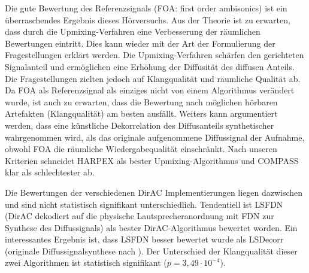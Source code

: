 Die gute Bewertung des Referenzsignals (FOA: first order ambisonics) ist ein überraschendes Ergebnis dieses Hörversuchs. Aus der Theorie ist zu erwarten, dass durch die Upmixing-Verfahren eine Verbesserung der räumlichen Bewertungen eintritt.
Dies kann wieder mit der Art der Formulierung der Fragestellungen erklärt werden.
Die Upmixing-Verfahren schärfen den gerichteten Signalanteil und ermöglichen eine Erhöhung der Diffusität des diffusen Anteils.
Die Fragestellungen zielten jedoch auf Klangqualität und räumliche Qualität ab.
Da FOA als Referenzsignal als einziges nicht von einem Algorithmus verändert wurde, ist auch zu erwarten, dass die Bewertung nach möglichen hörbaren Artefakten (Klangqualität) am besten ausfällt.
Weiters kann argumentiert werden, dass eine künstliche Dekorrelation des Diffusanteils synthetischer wahrgenommen wird, als das originale aufgenommene Diffussignal der Aufnahme, obwohl FOA die räumliche Wiedergabequalität einschränkt.
Nach unseren Kriterien schneidet HARPEX als bester Upmixing-Algorithmus und COMPASS klar als schlechtester ab.

Die Bewertungen der verschiedenen DirAC Implementierungen liegen dazwischen und sind nicht statistisch signifikant unterschiedlich.
Tendentiell ist LSFDN (DirAC dekodiert auf die physische Lautsprecheranordnung mit FDN zur Synthese des Diffussignals) als bester DirAC-Algorithmus bewertet worden.
Ein interessantes Ergebnis ist, dass LSFDN besser bewertet wurde als LSDecorr (originale Diffussignalsynthese nach \cite{pulkki}).
Der Unterschied der Klangqualität dieser zwei Algorithmen ist statistisch signifikant ($p=3,49 \cdot 10^{-4}$).
